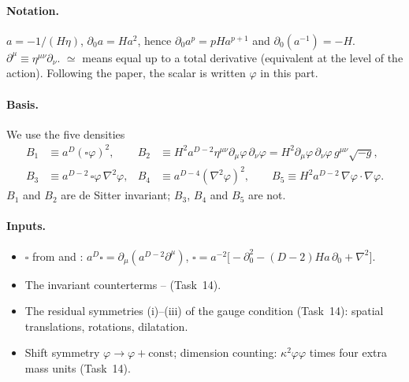 \paragraph{Notation.}
$a=-1/(H\eta)$, $\partial_0a=Ha^2$, hence $\partial_0a^p=pHa^{p+1}$ and $\partial_0(a^{-1})=-H$.
$\partial^\mu\equiv\eta^{\mu\nu}\partial_\nu$.
$\simeq$ means equal up to a total derivative (equivalent at the level of the action).
Following the paper, the scalar is written $\varphi$ in this part.

\paragraph{Basis.}
We use the five densities
\begin{equation}
\begin{aligned}
B_1&\equiv a^D(\square\varphi)^2, &
B_2&\equiv H^2a^{D-2}\eta^{\mu\nu}\partial_\mu\varphi\,\partial_\nu\varphi=H^2\partial_\mu\varphi\,\partial_\nu\varphi\,g^{\mu\nu}\sqrt{-g},\\
B_3&\equiv a^{D-2}\,\square\varphi\,\nabla^2\varphi, &
B_4&\equiv a^{D-4}(\nabla^2\varphi)^2, \qquad
B_5\equiv H^2a^{D-2}\,\nabla\varphi\cdot\nabla\varphi .
\end{aligned}
\label{eq:ch7-basis}
\end{equation}
$B_1$ and $B_2$ are de Sitter invariant; $B_3$, $B_4$ and $B_5$ are not.

\paragraph{Inputs.}
\begin{itemize}[leftmargin=22pt]
\item[(G1)] \tP{} $\square$ from  and : $a^D\square=\partial_\mu(a^{D-2}\partial^\mu)$, $\square=a^{-2}\big[-\partial_0^2-(D-2)Ha\,\partial_0+\nabla^2\big]$.
\item[(G2)] \tD{} The invariant counterterms -- (Task~14).
\item[(G3)] \tD{} The residual symmetries (i)--(iii) of the gauge condition (Task~14): spatial translations, rotations, dilatation.
\item[(G4)] Shift symmetry $\varphi\to\varphi+\text{const}$; dimension counting: $\kappa^2\varphi\varphi$ times four extra mass units (Task~14).
\end{itemize}

